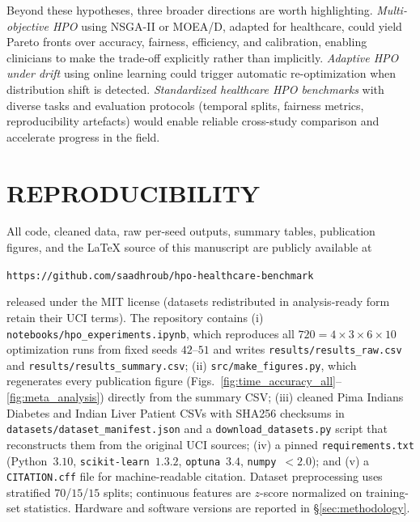 \documentclass[letterpaper, 10 pt, conference]{ieeeconf}
\begin{document}
Beyond these hypotheses, three broader directions are worth highlighting. \emph{Multi-objective HPO} using NSGA-II or MOEA/D, adapted for healthcare, could yield Pareto fronts over accuracy, fairness, efficiency, and calibration, enabling clinicians to make the trade-off explicitly rather than implicitly. \emph{Adaptive HPO under drift} using online learning could trigger automatic re-optimization when distribution shift is detected. \emph{Standardized healthcare HPO benchmarks} with diverse tasks and evaluation protocols (temporal splits, fairness metrics, reproducibility artefacts) would enable reliable cross-study comparison and accelerate progress in the field.

\section{REPRODUCIBILITY}
\label{sec:reproducibility}

All code, cleaned data, raw per-seed outputs, summary tables, publication figures, and the \LaTeX{} source of this manuscript are publicly available at

\begin{center}
\texttt{https://github.com/saadhroub/hpo-healthcare-benchmark}
\end{center}

\noindent released under the MIT license (datasets redistributed in analysis-ready form retain their UCI terms). The repository contains (i) \texttt{notebooks/hpo\_experiments.ipynb}, which reproduces all $720 = 4 \times 3 \times 6 \times 10$ optimization runs from fixed seeds $42$--$51$ and writes \texttt{results/results\_raw.csv} and \texttt{results/results\_summary.csv}; (ii) \texttt{src/make\_figures.py}, which regenerates every publication figure (Figs.~\ref{fig:time_accuracy_all}--\ref{fig:meta_analysis}) directly from the summary CSV; (iii) cleaned Pima Indians Diabetes and Indian Liver Patient CSVs with SHA256 checksums in \texttt{datasets/dataset\_manifest.json} and a \texttt{download\_datasets.py} script that reconstructs them from the original UCI sources; (iv) a pinned \texttt{requirements.txt} (Python~$3.10$, \texttt{scikit-learn}~$1.3.2$, \texttt{optuna}~$3.4$, \texttt{numpy}~$<2.0$); and (v) a \texttt{CITATION.cff} file for machine-readable citation. Dataset preprocessing uses stratified $70$/$15$/$15$ splits; continuous features are $z$-score normalized on training-set statistics. Hardware and software versions are reported in \S\ref{sec:methodology}.
\end{document}

